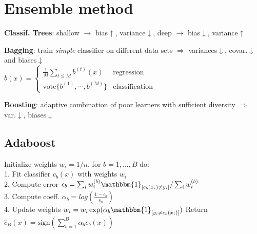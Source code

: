 \section{Ensemble method}

\textbf{Classif. Trees}: shallow $\rightarrow$ bias$\uparrow$, variance$\downarrow$, deep $\rightarrow$ bias$\downarrow$, variance$\uparrow$

\textbf{Bagging}: train \textit{simple} classifier on different data sets $\Rightarrow$ variances$\downarrow$, covar.$\downarrow$ and biases$\downarrow$ \\
$\hat{b}(x) = \left\{ \begin{array}{ll} \frac{1}{M}\sum_{t \leq M} b^{(t)}(x) & \mathrm{regression} \\ \mathrm{vote}\{ b^{(1)}, \cdots, b^{(M)} \} & \mathrm{classification}   \end{array} \right.$

\textbf{Boosting}: adaptive combination of poor learners with sufficient diversity $\Rightarrow$ var.$\downarrow$, biases$\downarrow$

\begin{comment}
\subsection*{Random Forest}
for b=1:B do:\\
draw a bootstrap sample $D_b$\\
repeat until node size<$n_{min}$:\\
1. select $m$ features from $p$ features\\
2. pick the best variable and split-point\\
3. Split the node accordingly\\
return the forest $\{\hat{c}_b(x)\}_{b=1}^B$
\end{comment}

\subsection*{Adaboost}
Initialize weights $w_i = 1/n$, for $b = 1,...,B$ do: \\
1. Fit classifier $c_b(x)$ with weights $w_i$ \\
2. Compute error $\epsilon_b = \sum_i w_i^{(b)} \mathbbm{1}_{[c_b(x_i) \not = y_i]} / \sum_i w_i^{(b)}$\\
3. Compute coeff. $\alpha_b = log(\frac{1-\epsilon_b}{\epsilon_b})$\\
4. Update weights $w_i = w_i \exp(\alpha_b \mathbbm{1}_{[y_i \not = c_b(x_i)]})$
Return $\hat{c}_B(x) = \text{sign} \left ( \sum_{b=1}^B \alpha_b c_b(x) \right )$\\

